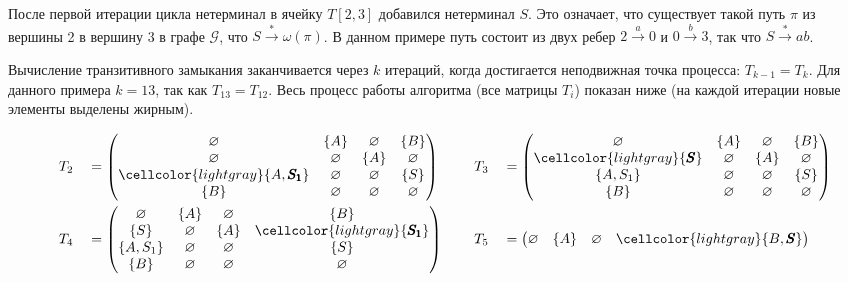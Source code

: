 \begin{example}
После первой итерации цикла нетерминал в ячейку $T[2,3]$ добавился нетерминал $S$.
Это означает, что существует такой путь $\pi$ из вершины 2 в вершину 3 в графе $\mathcal{G}$, что $S \xrightarrow{*} \omega(\pi)$. В данном примере путь состоит из двух ребер $2 \xrightarrow{a} 0$ и $ 0 \xrightarrow{b} 3$, так что $S \xrightarrow{*} ab$.

Вычисление транзитивного замыкания заканчивается через $k$ итераций, когда достигается неподвижная точка процесса: $T_{k-1} = T_k$. Для данного примера $k = 13$, так как $T_{13} = T_{12}$. Весь процесс работы алгоритма (все матрицы $T_i$) показан ниже (на каждой итерации новые элементы выделены жирным).

{\footnotesize
\begin{alignat*}{7}
& &&T_2 &&= \begin{pmatrix}
\varnothing & \{A\}       & \varnothing & \{B\}       \\
\varnothing & \varnothing & \{A\}       & \varnothing \\
\cellcolor{lightgray} \{A, \pmb{S_1}\}  & \varnothing & \varnothing & \{S\}       \\
\{B\}       & \varnothing & \varnothing & \varnothing \\
\end{pmatrix} \ \ \ \ &&T_3 &&= \begin{pmatrix}
\varnothing & \{A\}       & \varnothing & \{B\}       \\
\cellcolor{lightgray} \{\pmb{S}\}       & \varnothing & \{A\}       & \varnothing \\
\{A, S_1\}  & \varnothing & \varnothing & \{S\}       \\
\{B\}       & \varnothing & \varnothing & \varnothing \\
\end{pmatrix} \\ & &&T_4 &&= \begin{pmatrix}
\varnothing & \{A\}       & \varnothing & \{B\}       \\
\{S\}       & \varnothing & \{A\}       & \cellcolor{lightgray} \{\pmb{S_1}\}     \\
\{A, S_1\}  & \varnothing & \varnothing & \{S\}       \\
\{B\}       & \varnothing & \varnothing & \varnothing \\
\end{pmatrix}  \ \ \ \ &&T_5 &&= \begin{pmatrix}
\varnothing & \{A\}       & \varnothing & \cellcolor{lightgray} \{B, \pmb{S}\}    \\

\end{pmatrix}
\end{alignat*}}
\end{example}
